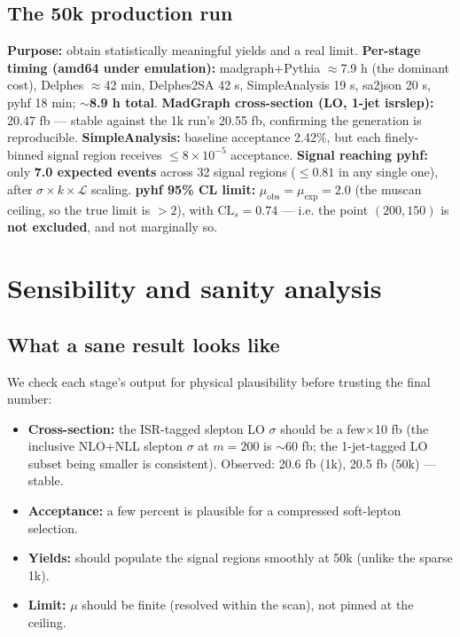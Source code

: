 \documentclass[11pt,oneside]{report}
\begin{document}
\section{The 50k production run}
\textbf{Purpose:} obtain statistically meaningful yields and a real limit.
\textbf{Per-stage timing (amd64 under emulation):} madgraph+Pythia $\approx$7.9 h (the dominant
cost), Delphes $\approx$42 min, Delphes2SA 42 s, SimpleAnalysis 19 s, sa2json 20 s, pyhf 18 min;
\textbf{$\sim$8.9 h total}.
\textbf{MadGraph cross-section (LO, 1-jet isrslep):} 20.47 fb --- stable against the 1k run's
20.55 fb, confirming the generation is reproducible.
\textbf{SimpleAnalysis:} baseline acceptance 2.42\%, but each finely-binned signal region receives
$\le 8\times10^{-5}$ acceptance.
\textbf{Signal reaching pyhf:} only \textbf{7.0 expected events} across 32 signal regions
($\le 0.81$ in any single one), after $\sigma\times k\times\mathcal{L}$ scaling.
\textbf{pyhf 95\% CL limit:} $\mu_{\mathrm{obs}}=\mu_{\mathrm{exp}}=2.0$ (the muscan ceiling, so the
true limit is $>2$), with $\mathrm{CL}_s=0.74$ --- i.e. the point $(200,150)$ is \textbf{not
excluded}, and not marginally so.

\chapter{Sensibility and sanity analysis}
\label{ch:sanity}
\section{What a sane result looks like}
We check each stage's output for physical plausibility before trusting the final number:
\begin{itemize}[nosep]
  \item \textbf{Cross-section:} the ISR-tagged slepton LO $\sigma$ should be a few$\times$10 fb
        (the inclusive NLO+NLL slepton $\sigma$ at $m=200$ is $\sim$60 fb; the 1-jet-tagged LO
        subset being smaller is consistent). Observed: 20.6 fb (1k), 20.5 fb (50k) --- stable.
  \item \textbf{Acceptance:} a few percent is plausible for a compressed soft-lepton selection.
  \item \textbf{Yields:} should populate the signal regions smoothly at 50k (unlike the sparse 1k).
  \item \textbf{Limit:} $\mu$ should be finite (resolved within the scan), not pinned at the ceiling.
\end{itemize}
\end{document}
